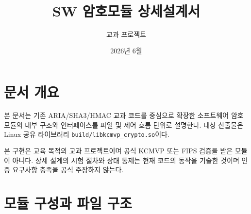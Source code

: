 \documentclass[11pt,a4paper]{article}
\title{SW 암호모듈 상세설계서}
\author{교과 프로젝트}
\date{2026년 6월}
\begin{document}
\maketitle
\tableofcontents
\newpage

\section{문서 개요}

본 문서는 기존 ARIA/SHA3/HMAC 교과 코드를 중심으로 확장한 소프트웨어
암호모듈의 내부 구조와 인터페이스를 파일 및 제어 흐름 단위로 설명한다.
대상 산출물은 Linux 공유 라이브러리 \texttt{build/libkcmvp\_crypto.so}이다.

본 구현은 교육 목적의 교과 프로젝트이며 공식 KCMVP 또는 FIPS 검증을
받은 모듈이 아니다. 상세 설계의 시험 절차와 상태 통제는 현재 코드의
동작을 기술한 것이며 인증 요구사항 충족을 공식 주장하지 않는다.

\section{모듈 구성과 파일 구조}
\end{document}
